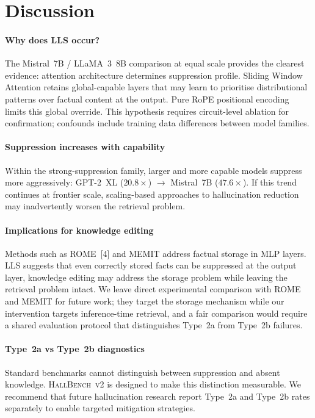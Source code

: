 \documentclass{article}
\begin{document}
\section{Discussion}

\paragraph{Why does LLS occur?}
The Mistral~7B / LLaMA~3~8B comparison at equal scale provides the
clearest evidence: attention architecture determines suppression profile.
Sliding Window Attention retains global-capable layers that may learn to
prioritise distributional patterns over factual content at the output.
Pure RoPE positional encoding limits this global override.
This hypothesis requires circuit-level ablation for confirmation;
confounds include training data differences between model families.

\paragraph{Suppression increases with capability}
Within the strong-suppression family, larger and more capable models
suppress more aggressively: GPT-2~XL ($20.8\times$) $\to$ Mistral~7B
($47.6\times$).
If this trend continues at frontier scale, scaling-based approaches to
hallucination reduction may inadvertently worsen the retrieval problem.

\paragraph{Implications for knowledge editing}
Methods such as ROME~[4] and MEMIT address factual storage in MLP layers.
LLS suggests that even correctly stored facts can be suppressed at the
output layer, knowledge editing may address the storage problem while
leaving the retrieval problem intact.
We leave direct experimental comparison with ROME and MEMIT for future
work; they target the storage mechanism while our intervention targets
inference-time retrieval, and a fair comparison would require a shared
evaluation protocol that distinguishes Type~2a from Type~2b failures.

\paragraph{Type~2a vs Type~2b diagnostics}
Standard benchmarks cannot distinguish between suppression and absent
knowledge.
\textsc{HallBench~v2} is designed to make this distinction measurable.
We recommend that future hallucination research report Type~2a and Type~2b
rates separately to enable targeted mitigation strategies.
\end{document}
